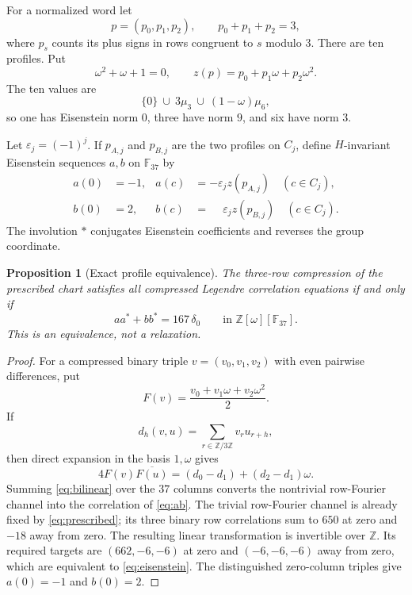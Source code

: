 \documentclass[11pt]{article}
\newtheorem{proposition}[theorem]{Proposition}
\theoremstyle{remark}
\newcommand{\F}{\mathbb F}
\newcommand{\Z}{\mathbb Z}
\newcommand{\eps}{\varepsilon}
\begin{document}
For a normalized word let
\[
 p=(p_0,p_1,p_2),\qquad p_0+p_1+p_2=3,
\]
where $p_s$ counts its plus signs in rows congruent to $s$ modulo $3$.
There are ten profiles.  Put
\[
 \omega^2+\omega+1=0,\qquad
 z(p)=p_0+p_1\omega+p_2\omega^2.
\]
The ten values are
\begin{equation}
 \{0\}\ \cup\ 3\mu_3\ \cup\ (1-\omega)\mu_6,
 \label{eq:alphabet}
\end{equation}
so one has Eisenstein norm $0$, three have norm $9$, and six have norm
$3$.

Let $\eps_j=(-1)^j$.  If $p_{A,j}$ and $p_{B,j}$ are the two profiles on
$C_j$, define $H$-invariant Eisenstein sequences $a,b$ on $\F_{37}$ by
\begin{align}
 a(0)&=-1,&a(c)&=-\eps_jz(p_{A,j})\quad(c\in C_j),\nonumber\\
 b(0)&=2,&b(c)&=\phantom{-}\eps_jz(p_{B,j})\quad(c\in C_j).
 \label{eq:ab}
\end{align}
The involution $*$ conjugates Eisenstein coefficients and reverses the
group coordinate.

\begin{proposition}[Exact profile equivalence]
\label{prop:profile-equivalence}
The three-row compression of the prescribed chart satisfies all compressed
Legendre correlation equations if and only if
\begin{equation}
 aa^*+bb^*=167\,\delta_0
 \qquad\text{in }\Z[\omega][\F_{37}].
 \label{eq:eisenstein}
\end{equation}
This is an equivalence, not a relaxation.
\end{proposition}

\begin{proof}
For a compressed binary triple $v=(v_0,v_1,v_2)$ with even pairwise
differences, put
\[
 F(v)=\frac{v_0+v_1\omega+v_2\omega^2}{2}.
\]
If
\[
 d_h(v,u)=\sum_{r\in\Z/3\Z}v_ru_{r+h},
\]
then direct expansion in the basis $1,\omega$ gives
\begin{equation}
 4F(v)\overline{F(u)}
   =(d_0-d_1)+(d_2-d_1)\omega.
 \label{eq:bilinear}
\end{equation}
Summing \eqref{eq:bilinear} over the $37$ columns converts the nontrivial
row-Fourier channel into the correlation of \eqref{eq:ab}.  The trivial
row-Fourier channel is already fixed by \eqref{eq:prescribed}; its three
binary row correlations sum to $650$ at zero and $-18$ away from zero.
The resulting linear transformation is invertible over $\Z$.  Its required
targets are $(662,-6,-6)$ at zero and $(-6,-6,-6)$ away from zero, which
are equivalent to \eqref{eq:eisenstein}.  The distinguished zero-column
triples give $a(0)=-1$ and $b(0)=2$.
\end{proof}
\end{document}
